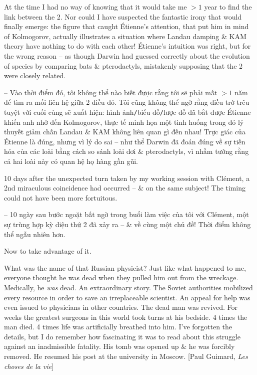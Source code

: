 \documentclass{article}
\begin{document}
\begin{enumerate}
	At the time I had no way of knowing that it would take me $> 1$ year to find the link between the 2. Nor could I have suspected the fantastic irony that would finally emerge: the figure that caught {\sc\'Etienne}'s attention, that put him in mind of {\sc Kolmogorov}, actually illustrates a situation where {\sc Landau} damping \& KAM theory have nothing to do with each other! {\sc\'Etienne}'s intuition was right, but for the wrong reason -- as though {\sc Darwin} had guessed correctly about the evolution of species by comparing bats \& pterodactyls, mistakenly supposing that the 2 were closely related.
	
	-- Vào thời điểm đó, tôi không thể nào biết được rằng tôi sẽ phải mất $>1$ năm để tìm ra mối liên hệ giữa 2 điều đó. Tôi cũng không thể ngờ rằng điều trớ trêu tuyệt vời cuối cùng sẽ xuất hiện: hình ảnh{\tt/}biểu đồ{\tt/}lược đồ đã bắt được {\sc\'Etienne } khiến anh nhớ đến {\sc Kolmogorov}, thực tế minh họa một tình huống trong đó lý thuyết giảm chấn {\sc Landau} \& KAM không liên quan gì đến nhau! Trực giác của {\sc\'Etienne} là đúng, nhưng vì lý do sai -- như thể {\sc Darwin} đã đoán đúng về sự tiến hóa của các loài bằng cách so sánh loài dơi \& pterodactyls, vì nhầm tưởng rằng cả hai loài này có quan hệ họ hàng gần gũi.
	
	10 days after the unexpected turn taken by my working session with Cl\'ement, a 2nd miraculous coincidence had occurred -- \& on the same subject! The timing could not have been more fortuitous.
	
	-- 10 ngày sau bước ngoặt bất ngờ trong buổi làm việc của tôi với Cl\'ement, một sự trùng hợp kỳ diệu thứ 2 đã xảy ra -- \& về cùng một chủ đề! Thời điểm không thể ngẫu nhiên hơn.
	
	Now to take advantage of it.
	
	What was the name of that Russian physicist? Just like what happened to me, everyone thought he was dead when they pulled him out from the wreckage. Medically, he {\it was} dead. An extraordinary story. The Soviet authorities mobilized every resource in order to save an irreplaceable scientist. An appeal for help was even issued to physicians in other countries. The dead man was revived. For weeks the greatest surgeons in this world took turns at his bedside. 4 times the man died. 4 times life was artificially breathed into him. I've forgotten the details, but I do remember how fascinating it was to read about this struggle against an inadmissible fatality. His tomb was opened up \& he was forcibly removed. He resumed his post at the university in Moscow. [{\sc Paul Guimard}, {\it Les choses de la vie}]
	

\end{enumerate}
\end{document}
